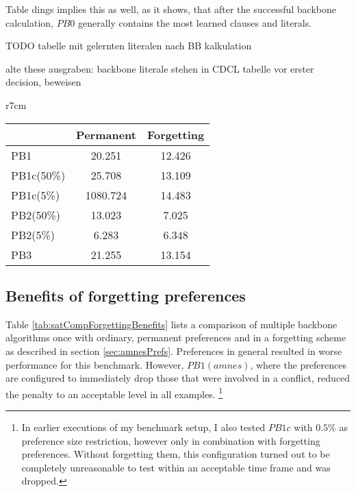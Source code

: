 Table dings implies this as well, as it shows, that after the successful backbone calculation, $PB0$ generally contains the most learned clauses and literals.

TODO tabelle mit gelernten literalen nach BB kalkulation

alte these ausgraben: backbone literale stehen in CDCL tabelle vor erster decision, beweisen


\begin{wraptable}[14]{r}{7cm} %
\begin{tabular}{l| c c }
 & Permanent & Forgetting  \\
\hline
PB1 &	20.251 & 12.426 \\
PB1c(50\%) & 25.708 & 13.109 \\
PB1c(5\%) & 1080.724 & 14.483 \\
PB2(50\%) & 13.023 & 7.025 \\
PB2(5\%) & 6.283 & 6.348 \\
PB3 & 21.255 & 13.154 \\
\end{tabular}
\caption{Average of the complete backbone computation for variants of $PrefBones$ with and without forgetting preferences.}
\label{tab:satCompForgettingBenefits}
\end{wraptable}


\subsection{Benefits of forgetting preferences}
Table \ref{tab:satCompForgettingBenefits}
lists a comparison of multiple backbone algorithms once with ordinary, permanent preferences and in a forgetting scheme as described in section \ref{sec:amnesPrefs}. Preferences in general resulted in worse performance for this benchmark. However, $PB1(amnes)$, where the preferences are configured to immediately drop those that were involved in a conflict, reduced the penalty to an acceptable level in all examples. \footnote{
In earlier executions of my benchmark setup, I also tested $PB1c$ with $0.5\%$ as preference size restriction, however only in combination with forgetting preferences. Without forgetting them, this configuration turned out to be completely unreasonable to test within an acceptable time frame and was dropped.}



